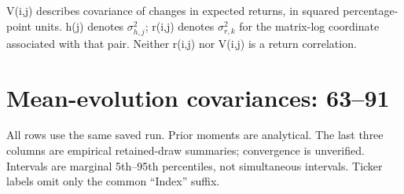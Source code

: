 \documentclass[10pt,a4paper]{article}
\begin{document}
\par\medskip\footnotesize
V(i,j) describes covariance of changes in expected returns, in squared percentage-point units.
h(j) denotes $\sigma_{h,j}^{2}$; r(i,j) denotes $\sigma_{r,k}^{2}$ for the matrix-log coordinate
associated with that pair. Neither r(i,j) nor V(i,j) is a return correlation.

\clearpage\section*{Mean-evolution covariances: 63--91}

\small All rows use the same saved run. Prior moments are analytical.
The last three columns are empirical retained-draw summaries; convergence is unverified.
Intervals are marginal 5th--95th percentiles, not simultaneous intervals.
Ticker labels omit only the common ``Index'' suffix.
\par\medskip
\begingroup\fontsize{7.8}{10.5}\selectfont\setlength{\tabcolsep}{3pt}
\renewcommand{\arraystretch}{1.45}
\end{document}
